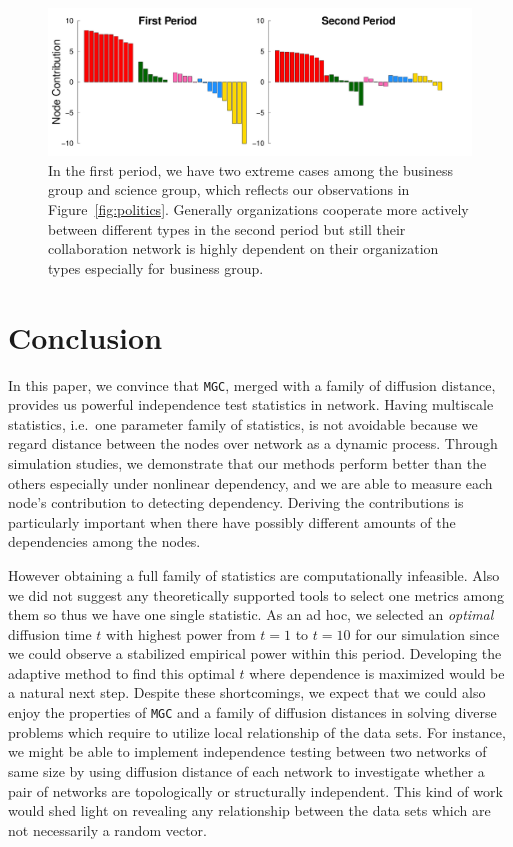 \documentclass[11pt]{article}
\theoremstyle{definition}
\begin{document}
\begin{figure}[h]
	\centering
	\includegraphics[width=\linewidth]{../Figure/barplots_nolegend.pdf}	
	\caption{In the first period, we have two extreme cases among the business group and science group, which reflects our observations in Figure~\ref{fig:politics}. Generally organizations cooperate more actively between different types in the second period but still their collaboration network is highly dependent on their organization types especially for business group.}
	\label{fig:barplots}
\end{figure}


\vspace*{-0.5cm}
\section{Conclusion}
\label{sec:conc}
	\vspace*{-0.2cm}
In this paper, we convince that \texttt{MGC}, merged with a family of diffusion distance, provides us powerful independence test statistics in network. Having multiscale statistics, i.e.~one parameter family of statistics, is not avoidable because we regard distance between the nodes over network as a dynamic process. Through simulation studies, we demonstrate that our methods perform better than the others especially under nonlinear dependency, and we are able to measure each node's contribution to detecting dependency. Deriving the contributions is particularly important when there have possibly different amounts of the dependencies among the nodes.  

However obtaining a full family of statistics are computationally infeasible. Also we did not suggest any theoretically supported tools to select one metrics among them so thus we have one single statistic. As an ad hoc, we selected an \textit{optimal} diffusion time $t$ with highest power from $t=1$ to $t=10$ for our simulation since we could observe a stabilized empirical power within this period. Developing the adaptive method to find this optimal $t$ where dependence is maximized would be a natural next step. Despite these shortcomings, we expect that we could also enjoy the properties of \texttt{MGC} and a family of diffusion distances in solving diverse problems which require to utilize local relationship of the data sets. For instance, we might be able to implement independence testing between two networks of same size by using diffusion distance of each network to investigate whether a pair of networks are topologically or structurally independent. This kind of work would shed light on revealing any relationship between the data sets which are not necessarily a random vector.
\end{document}
